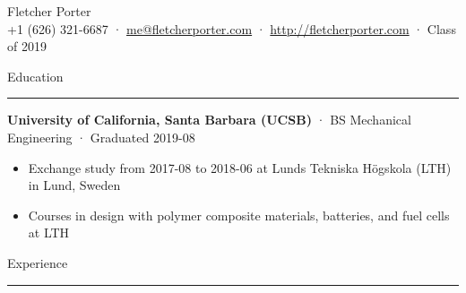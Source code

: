 \documentclass[12pt, oneside]{article}
\newcommand{\titlestyle}[1] {
	{\fontsize{50pt}{1em}\selectfont \textcolor{new_red}{\textsf{#1}}} \\
}
\newcommand{\headingstyleJobs}[1] {
	{\fontsize{19pt}{1em}\selectfont \textcolor{new_red}{\textsf{#1}}}
	\textcolor{new_red}{\rule{3.25in}{0.5pt}} \vspace{3pt}
}
\newcommand{\infostyle}[1] {
	{\fontsize{9pt}{1em}\selectfont #1} \\ \vspace{10pt}
}
\newcommand{\jobtitle}[3] {
	{\bf #1} · {#2} · {#3} \vspace{-7pt} \\
}
\begin{document}
\begin{flushleft}



\titlestyle{Fletcher Porter}
\infostyle{+1 (626) 321-6687 · \href{mailto:me@fletcherporter.com}{me@fletcherporter.com} · \url{http://fletcherporter.com} · Class of 2019}


\headingstyleJobs{Education}

\jobtitle{University of California, Santa Barbara (UCSB)}{BS Mechanical Engineering}{Graduated 2019-08}
\begin{itemize}
	\item Exchange study from 2017-08 to 2018-06 at Lunds Tekniska Högskola (LTH) in Lund, Sweden \\
	\item Courses in design with polymer composite materials, batteries, and fuel cells at LTH
\end{itemize}



\headingstyleJobs{Experience}


\end{flushleft}
\end{document}
